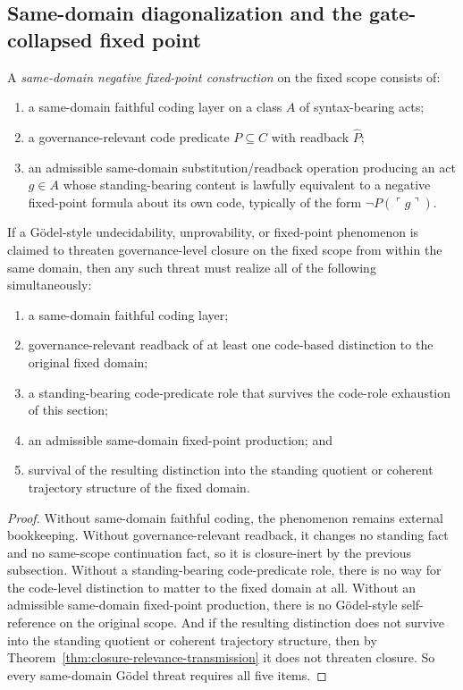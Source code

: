 \subsection{Same-domain diagonalization and the gate-collapsed fixed point}

\begin{definition}
A \emph{same-domain negative fixed-point construction} on the fixed scope consists of:
\begin{enumerate}
  \item a same-domain faithful coding layer on a class $A$ of syntax-bearing acts;
  \item a governance-relevant code predicate $P\subseteq C$ with readback $\widehat P$;
  \item an admissible same-domain substitution/readback operation producing an act $g\in A$ whose standing-bearing content is lawfully equivalent to a negative fixed-point formula about its own code, typically of the form $\neg P(\ulcorner g\urcorner)$.
\end{enumerate}
\end{definition}

\begin{theorem}
\label{thm:same-domain-godel-prerequisites}
If a G\"odel-style undecidability, unprovability, or fixed-point phenomenon is claimed to threaten governance-level closure on the fixed scope from within the same domain, then any such threat must realize all of the following simultaneously:
\begin{enumerate}
  \item a same-domain faithful coding layer;
  \item governance-relevant readback of at least one code-based distinction to the original fixed domain;
  \item a standing-bearing code-predicate role that survives the code-role exhaustion of this section;
  \item an admissible same-domain fixed-point production; and
  \item survival of the resulting distinction into the standing quotient or coherent trajectory structure of the fixed domain.
\end{enumerate}
\end{theorem}

\begin{proof}
Without same-domain faithful coding, the phenomenon remains external bookkeeping. Without governance-relevant readback, it changes no standing fact and no same-scope continuation fact, so it is closure-inert by the previous subsection. Without a standing-bearing code-predicate role, there is no way for the code-level distinction to matter to the fixed domain at all. Without an admissible same-domain fixed-point production, there is no G\"odel-style self-reference on the original scope. And if the resulting distinction does not survive into the standing quotient or coherent trajectory structure, then by Theorem~\ref{thm:closure-relevance-transmission} it does not threaten closure. So every same-domain G\"odel threat requires all five items.
\end{proof}

